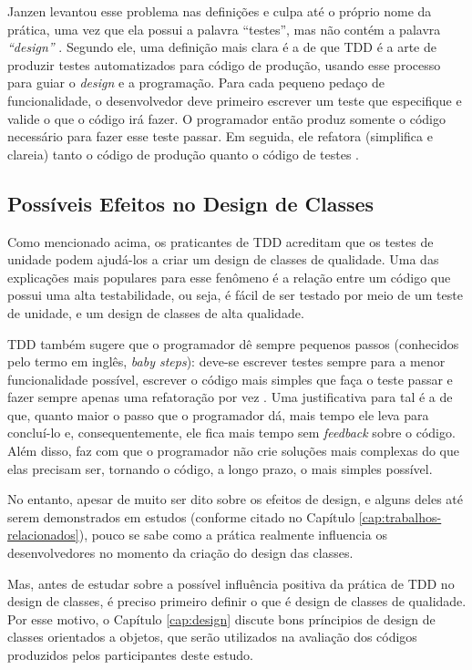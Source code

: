 Janzen levantou esse problema nas definições e culpa até o próprio nome da prática, uma vez
que ela possui a palavra ``testes'', mas não contém a palavra \textit{``design''} 
\cite{tdd-really-improve}.
Segundo ele, uma definição mais clara é a de que TDD é a arte de produzir testes
automatizados para código de produção, usando esse processo para guiar o \textit{design} e a programação.
Para cada pequeno pedaço de funcionalidade, o desenvolvedor deve primeiro
escrever um teste que especifique e valide o que o código irá fazer. O
programador então produz somente o código necessário para fazer esse teste
passar. Em seguida, ele refatora (simplifica e clareia) tanto o código de produção
quanto o código de testes \cite{agilealliance-tdd} \cite{tdd-taxonomy}.

\subsection{Possíveis Efeitos no Design de Classes}

Como mencionado acima, os praticantes de TDD acreditam que os testes de unidade
podem ajudá-los a criar um design de classes de qualidade. Uma das explicações mais
populares para esse fenômeno é a relação
entre um código que possui uma alta testabilidade, ou seja, é fácil de ser testado
por meio de um teste de unidade, e um design de classes de alta qualidade.

TDD também sugere que o programador dê sempre pequenos passos (conhecidos pelo termo em
inglês, \textit{baby steps}): deve-se escrever testes sempre para a menor
funcionalidade possível, escrever o código mais simples que faça o teste passar
e fazer sempre apenas uma refatoração por vez \cite{TDDByExample}.
Uma justificativa para tal é a de que, quanto maior o passo que o programador dá, mais
tempo ele leva para concluí-lo e, consequentemente, ele fica mais tempo
sem \textit{feedback} sobre o código. Além disso, faz com que o programador não crie
soluções mais complexas do que elas precisam ser, tornando o código, a longo
prazo, o mais simples possível.

No entanto, apesar de muito ser dito sobre os efeitos de design, e alguns deles
até serem demonstrados em estudos (conforme citado no Capítulo \ref{cap:trabalhos-relacionados}), 
pouco se sabe como a prática realmente influencia os desenvolvedores no momento da criação do
design das classes.

Mas, antes de estudar sobre a possível influência positiva da prática de TDD no design de classes,
é preciso primeiro definir o que é design de classes de qualidade. Por esse motivo, o 
Capítulo \ref{cap:design}
discute bons príncipios de design de classes orientados a objetos, que serão utilizados
na avaliação dos códigos produzidos pelos participantes deste estudo.